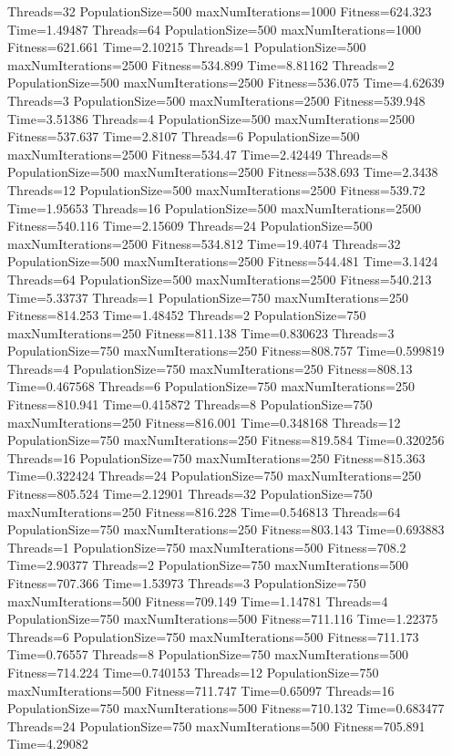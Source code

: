 \documentclass[10pt,letterpaper]{article}
\begin{document}
Threads=32 PopulationSize=500 maxNumIterations=1000 Fitness=624.323 Time=1.49487
Threads=64 PopulationSize=500 maxNumIterations=1000 Fitness=621.661 Time=2.10215
Threads=1 PopulationSize=500 maxNumIterations=2500 Fitness=534.899 Time=8.81162
Threads=2 PopulationSize=500 maxNumIterations=2500 Fitness=536.075 Time=4.62639
Threads=3 PopulationSize=500 maxNumIterations=2500 Fitness=539.948 Time=3.51386
Threads=4 PopulationSize=500 maxNumIterations=2500 Fitness=537.637 Time=2.8107
Threads=6 PopulationSize=500 maxNumIterations=2500 Fitness=534.47 Time=2.42449
Threads=8 PopulationSize=500 maxNumIterations=2500 Fitness=538.693 Time=2.3438
Threads=12 PopulationSize=500 maxNumIterations=2500 Fitness=539.72 Time=1.95653
Threads=16 PopulationSize=500 maxNumIterations=2500 Fitness=540.116 Time=2.15609
Threads=24 PopulationSize=500 maxNumIterations=2500 Fitness=534.812 Time=19.4074
Threads=32 PopulationSize=500 maxNumIterations=2500 Fitness=544.481 Time=3.1424
Threads=64 PopulationSize=500 maxNumIterations=2500 Fitness=540.213 Time=5.33737
Threads=1 PopulationSize=750 maxNumIterations=250 Fitness=814.253 Time=1.48452
Threads=2 PopulationSize=750 maxNumIterations=250 Fitness=811.138 Time=0.830623
Threads=3 PopulationSize=750 maxNumIterations=250 Fitness=808.757 Time=0.599819
Threads=4 PopulationSize=750 maxNumIterations=250 Fitness=808.13 Time=0.467568
Threads=6 PopulationSize=750 maxNumIterations=250 Fitness=810.941 Time=0.415872
Threads=8 PopulationSize=750 maxNumIterations=250 Fitness=816.001 Time=0.348168
Threads=12 PopulationSize=750 maxNumIterations=250 Fitness=819.584 Time=0.320256
Threads=16 PopulationSize=750 maxNumIterations=250 Fitness=815.363 Time=0.322424
Threads=24 PopulationSize=750 maxNumIterations=250 Fitness=805.524 Time=2.12901
Threads=32 PopulationSize=750 maxNumIterations=250 Fitness=816.228 Time=0.546813
Threads=64 PopulationSize=750 maxNumIterations=250 Fitness=803.143 Time=0.693883
Threads=1 PopulationSize=750 maxNumIterations=500 Fitness=708.2 Time=2.90377
Threads=2 PopulationSize=750 maxNumIterations=500 Fitness=707.366 Time=1.53973
Threads=3 PopulationSize=750 maxNumIterations=500 Fitness=709.149 Time=1.14781
Threads=4 PopulationSize=750 maxNumIterations=500 Fitness=711.116 Time=1.22375
Threads=6 PopulationSize=750 maxNumIterations=500 Fitness=711.173 Time=0.76557
Threads=8 PopulationSize=750 maxNumIterations=500 Fitness=714.224 Time=0.740153
Threads=12 PopulationSize=750 maxNumIterations=500 Fitness=711.747 Time=0.65097
Threads=16 PopulationSize=750 maxNumIterations=500 Fitness=710.132 Time=0.683477
Threads=24 PopulationSize=750 maxNumIterations=500 Fitness=705.891 Time=4.29082
\end{document}
